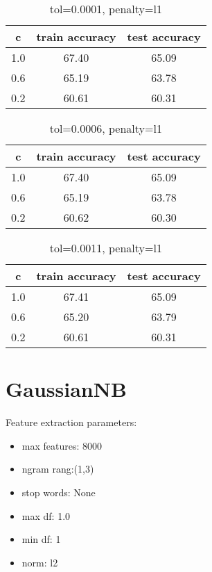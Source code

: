 \documentclass[a4paper,10pt]{article}
\begin{document}
\begin{table}[!h]
\centering
\begin{tabular}{|c|c|c|}
\hline
c&train accuracy&test accuracy\\
\hline
1.0&67.40&65.09\\
\hline
0.6&65.19&63.78\\
\hline
0.2&60.61&60.31\\
\hline

\end{tabular}
\caption{tol=0.0001, penalty=l1}
\end{table}

\begin{table}[!h]
\centering
\begin{tabular}{|c|c|c|}
\hline
c&train accuracy&test accuracy\\
\hline
1.0&67.40&65.09\\
\hline
0.6&65.19&63.78\\
\hline
0.2&60.62&60.30\\
\hline

\end{tabular}
\caption{tol=0.0006, penalty=l1}
\end{table}

\begin{table}[!h]
\centering
\begin{tabular}{|c|c|c|}
\hline
c&train accuracy&test accuracy\\
\hline
1.0&67.41&65.09\\
\hline
0.6&65.20&63.79\\
\hline
0.2&60.61&60.31\\
\hline

\end{tabular}
\caption{tol=0.0011, penalty=l1}
\end{table}
\newpage
\section{GaussianNB}
\par Feature extraction parameters:
\begin{itemize}
\item max features: 8000
\item ngram rang:(1,3)
\item stop words: None
\item max df: 1.0
\item min df: 1
\item norm: l2
\end{itemize}
\end{document}
